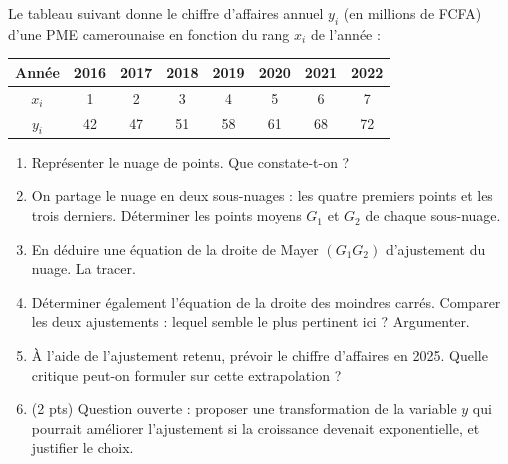 \documentclass[11pt]{article}
\begin{document}
\begin{exercice}
Le tableau suivant donne le chiffre d'affaires annuel $y_i$ (en millions de FCFA) d'une PME camerounaise en fonction du rang $x_i$ de l'année :

\begin{center}
\begin{tabular}{|c|c|c|c|c|c|c|c|}
\hline
Année & 2016 & 2017 & 2018 & 2019 & 2020 & 2021 & 2022 \\
\hline
$x_i$ & 1 & 2 & 3 & 4 & 5 & 6 & 7 \\
\hline
$y_i$ & 42 & 47 & 51 & 58 & 61 & 68 & 72 \\
\hline
\end{tabular}
\end{center}

\begin{enumerate}
\item Représenter le nuage de points. Que constate-t-on ?
\item On partage le nuage en deux sous-nuages : les quatre premiers points et les trois derniers. Déterminer les points moyens $G_1$ et $G_2$ de chaque sous-nuage.
\item En déduire une équation de la droite de Mayer $(G_1G_2)$ d'ajustement du nuage. La tracer.
\item Déterminer également l'équation de la droite des moindres carrés. Comparer les deux ajustements : lequel semble le plus pertinent ici ? Argumenter.
\item À l'aide de l'ajustement retenu, prévoir le chiffre d'affaires en 2025. Quelle critique peut-on formuler sur cette extrapolation ?
\item (2 pts) Question ouverte : proposer une transformation de la variable $y$ qui pourrait améliorer l'ajustement si la croissance devenait exponentielle, et justifier le choix.
\end{enumerate}
\end{exercice}
\end{document}

